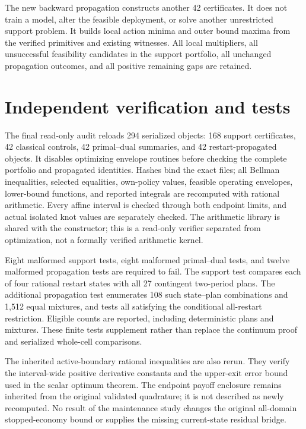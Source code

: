 The new backward propagation constructs another 42 certificates. It does not train a model, alter the feasible deployment, or solve another unrestricted support problem. It builds local action minima and outer bound maxima from the verified primitives and existing witnesses. All local multipliers, all unsuccessful feasibility candidates in the support portfolio, all unchanged propagation outcomes, and all positive remaining gaps are retained.

\section{Independent verification and tests}
The final read-only audit reloads 294 serialized objects: 168 support certificates, 42 classical controls, 42 primal--dual summaries, and 42 restart-propagated objects. It disables optimizing envelope routines before checking the complete portfolio and propagated identities. Hashes bind the exact files; all Bellman inequalities, selected equalities, own-policy values, feasible operating envelopes, lower-bound functions, and reported integrals are recomputed with rational arithmetic. Every affine interval is checked through both endpoint limits, and actual isolated knot values are separately checked. The arithmetic library is shared with the constructor; this is a read-only verifier separated from optimization, not a formally verified arithmetic kernel.

Eight malformed support tests, eight malformed primal--dual tests, and twelve malformed propagation tests are required to fail. The support test compares each of four rational restart states with all 27 contingent two-period plans. The additional propagation test enumerates 108 such state--plan combinations and 1,512 equal mixtures, and tests all satisfying the conditional all-restart restriction. Eligible counts are reported, including \RestartTreeFeasible{} deterministic plans and \RestartMixtureFeasible{} mixtures. These finite tests supplement rather than replace the continuum proof and serialized whole-cell comparisons.

The inherited active-boundary rational inequalities are also rerun. They verify the interval-wide positive derivative constants and the upper-exit error bound used in the scalar optimum theorem. The endpoint payoff enclosure remains inherited from the original validated quadrature; it is not described as newly recomputed. No result of the maintenance study changes the original all-domain stopped-economy bound or supplies the missing current-state residual bridge.


